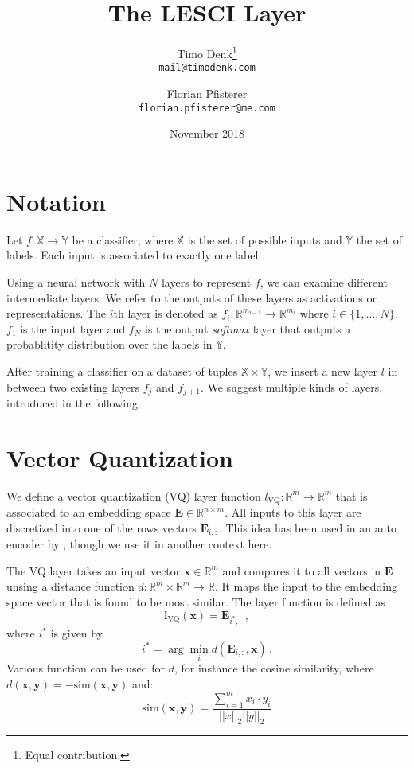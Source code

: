 \documentclass{article}
\title{The LESCI Layer}
\author{
  Timo  Denk\thanks{Equal contribution.}\\
  \texttt{mail@timodenk.com}
  \and
  Florian Pfisterer\footnotemark[1]\\
  \texttt{florian.pfisterer@me.com}
}
\date{November 2018}
\begin{document}
\maketitle

\section{Notation}

Let $f:\mathbb{X}\rightarrow\mathbb{Y}$ be a classifier, where $\mathbb{X}$ is the set of possible inputs and $\mathbb{Y}$ the set of labels. Each input is associated to exactly one label. 

Using a neural network with $N$ layers to represent $f$, we can examine different intermediate layers.
We refer to the outputs of these layers as activations or representations.
The $i$th layer is denoted as $f_i: \mathbb{R}^{m_{i-1}} \rightarrow \mathbb{R}^{m_{i}}$ where $i \in \{1,\ldots,N\}$.
$f_1$ is the input layer and $f_N$ is the output \textit{softmax} layer that outputs a probablitity distribution over the labels in $\mathbb{Y}.$

After training a classifier on a dataset of tuples $\mathbb{X}\times\mathbb{Y}$, we insert a new layer $l$ in between two existing layers $f_j$ and $f_{j+1}$. We suggest multiple kinds of layers, introduced in the following.

\section{Vector Quantization}

We define a vector quantization (VQ) layer function $l_\text{VQ}:\mathbb{R}^m\rightarrow\mathbb{R}^m$ that is associated to an embedding space $\bm{E}\in\mathbb{R}^{n\times m}$.
All inputs to this layer are discretized into one of the rows vectors $\bm{E}_{i,:}$.
This idea has been used in an auto encoder by \cite{vq-vae}, though we use it in another context here.

The VQ layer takes an input vector $\bm{x}\in\mathbb{R}^m$ and compares it to all vectors in $\bm{E}$ unsing a distance function $d:\mathbb{R}^{m}\times\mathbb{R}^{m}\rightarrow\mathbb{R}$.
It maps the input to the embedding space vector that is found to be most similar. The layer function is defined as
\begin{equation}
    \bm{l}_\text{VQ}\left(\bm{x}\right)=\bm{E}_{i^*,:}\,,
\end{equation}
where $i^*$ is given by
\begin{equation}
    i^*=\arg\min_i d\left(\bm{E}_{i,:},\bm{x}\right)\,.
    \label{vq-argmin}
\end{equation}
Various function can be used for $d$, for instance the cosine similarity, where $d(\bm{x}, \bm{y})=-\text{sim}(\bm{x}, \bm{y})$ and:
\begin{equation}
    \text{sim}(\bm{x}, \bm{y}) = \frac{\sum^m_{i=1} x_i\cdot y_i}{||x||_2 ||y||_2}
    \label{cos-sim}
\end{equation}
\end{document}
